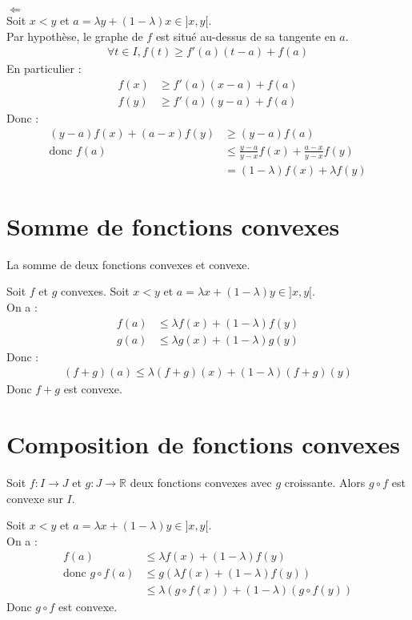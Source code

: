 \documentclass[../main.tex]{subfiles}
\begin{document}
$\boxed{\Leftarrow}$ \\
Soit $x < y$ et $a = \lambda y + (1-\lambda)x \in ]x, y[$. \\
Par hypothèse, le graphe de $f$ est situé au-dessus de sa tangente en $a$. 
\begin{align*}
    \forall t \in I, f(t) \geq f'(a)(t-a) + f(a)
\end{align*}
En particulier :
\begin{align*}
    f(x) &\geq f'(a)(x-a) + f(a) \\
    f(y) &\geq f'(a)(y-a) + f(a)
\end{align*}
Donc : 
\begin{align*}
    (y-a)f(x) + (a-x)f(y) &\geq (y-a)f(a) \\
    \text{donc } f(a) &\leq \frac{y-a}{y-x}f(x) + \frac{a-x}{y-x}f(y) \\
    &= (1-\lambda)f(x) + \lambda f(y)
\end{align*}

\section{Somme de fonctions convexes}
\begin{tcolorbox}[title=Propostion 19.17, title filled=false, colframe=lightblue, colback=lightblue!10!white]
    La somme de deux fonctions convexes et convexe. 
\end{tcolorbox}

\noindent Soit $f$ et $g$ convexes. Soit $x < y$ et $a = \lambda x + (1-\lambda)y \in ]x, y[$. \\
On a :
\begin{align*}
    f(a) &\leq \lambda f(x) + (1-\lambda)f(y) \\
    g(a) &\leq \lambda g(x) + (1-\lambda)g(y)
\end{align*}
Donc :
\begin{align*}
    (f+g)(a) \leq \lambda (f+g)(x) + (1-\lambda)(f+g)(y)
\end{align*}
Donc $f+g$ est convexe.

\section{Composition de fonctions convexes}
\begin{tcolorbox}[title=Propostion 19.18, title filled=false, colframe=lightblue, colback=lightblue!10!white]
    Soit $f:I\to J$ et $g:J\to \mathbb{R}$ deux fonctions convexes avec $g$ croissante. Alors $g\circ f$ est convexe sur $I$. 
\end{tcolorbox}

\noindent Soit $x < y$ et $a = \lambda x + (1-\lambda)y \in ]x, y[$. \\
On a :
\begin{align*}
    f(a) &\leq \lambda f(x) + (1-\lambda)f(y) \\
    \text{donc } g\circ f(a) &\leq g(\lambda f(x) + (1-\lambda)f(y)) \\
    &\leq \lambda (g\circ f(x)) + (1-\lambda)(g\circ f(y))
\end{align*}
Donc $g\circ f$ est convexe. 
\end{document}
